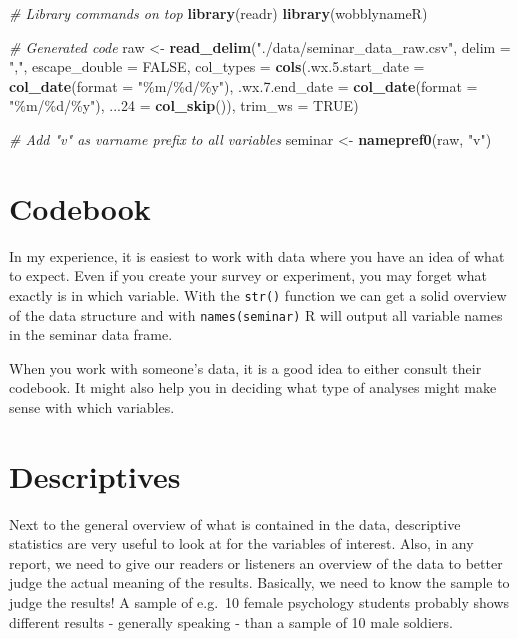 \documentclass[
]{book}
\newenvironment{Shaded}{\begin{snugshade}}{\end{snugshade}}
\newcommand{\AttributeTok}[1]{\textcolor[rgb]{0.13,0.29,0.53}{#1}}
\newcommand{\CommentTok}[1]{\textcolor[rgb]{0.56,0.35,0.01}{\textit{#1}}}
\newcommand{\ConstantTok}[1]{\textcolor[rgb]{0.56,0.35,0.01}{#1}}
\newcommand{\FunctionTok}[1]{\textcolor[rgb]{0.13,0.29,0.53}{\textbf{#1}}}
\newcommand{\NormalTok}[1]{#1}
\newcommand{\OtherTok}[1]{\textcolor[rgb]{0.56,0.35,0.01}{#1}}
\newcommand{\StringTok}[1]{\textcolor[rgb]{0.31,0.60,0.02}{#1}}
\begin{document}
\begin{Shaded}
\begin{Highlighting}[]
\CommentTok{\# Library commands on top}
\FunctionTok{library}\NormalTok{(readr)}
\FunctionTok{library}\NormalTok{(wobblynameR)}

\CommentTok{\# Generated code}
\NormalTok{raw }\OtherTok{\textless{}{-}} \FunctionTok{read\_delim}\NormalTok{(}\StringTok{"./data/seminar\_data\_raw.csv"}\NormalTok{, }
    \AttributeTok{delim =} \StringTok{","}\NormalTok{, }\AttributeTok{escape\_double =} \ConstantTok{FALSE}\NormalTok{, }
    \AttributeTok{col\_types =} \FunctionTok{cols}\NormalTok{(}\AttributeTok{.wx.5.start\_date =} \FunctionTok{col\_date}\NormalTok{(}\AttributeTok{format =} \StringTok{"\%m/\%d/\%y"}\NormalTok{),}
                     \AttributeTok{.wx.7.end\_date =} \FunctionTok{col\_date}\NormalTok{(}\AttributeTok{format =} \StringTok{"\%m/\%d/\%y"}\NormalTok{), }
                     \AttributeTok{...24 =} \FunctionTok{col\_skip}\NormalTok{()),}
    \AttributeTok{trim\_ws =} \ConstantTok{TRUE}\NormalTok{)}

\CommentTok{\# Add "v" as varname prefix to all variables}
\NormalTok{seminar }\OtherTok{\textless{}{-}} \FunctionTok{namepref0}\NormalTok{(raw, }\StringTok{"v"}\NormalTok{)}
\end{Highlighting}
\end{Shaded}

\section{Codebook}\label{codebook}

In my experience, it is easiest to work with data where you have an idea of what to expect.
Even if you create your survey or experiment, you may forget what exactly is in which variable.
With the \texttt{str()} function we can get a solid overview of the data structure and with \texttt{names(seminar)} R will output all variable names in the seminar data frame.

When you work with someone's data, it is a good idea to either consult their codebook.
It might also help you in deciding what type of analyses might make sense with which variables.

\section{Descriptives}\label{descriptives}

Next to the general overview of what is contained in the data, descriptive statistics are very useful to look at for the variables of interest.
Also, in any report, we need to give our readers or listeners an overview of the data to better judge the actual meaning of the results.
Basically, we need to know the sample to judge the results!
A sample of e.g.~10 female psychology students probably shows different results - generally speaking - than a sample of 10 male soldiers.
\end{document}
